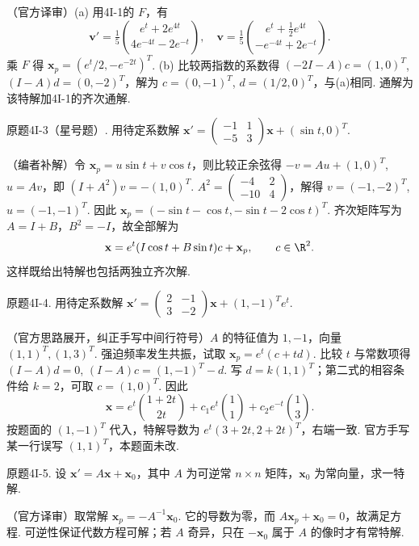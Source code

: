 \begin{solution}（官方译审）(a) 用4I-1的 $F$，有
\[\mathbf v'=\tfrac15\binom{e^t+2e^{4t}}{4e^{-4t}-2e^{-t}},\quad
\mathbf v=\tfrac15\binom{e^t+\frac12e^{4t}}{-e^{-4t}+2e^{-t}}.\]
乘 $F$ 得 $\mathbf x_p=(e^t/2,-e^{-2t})^T$. (b) 比较两指数的系数得 $(-2I-A)c=(1,0)^T$, $(I-A)d=(0,-2)^T$，解为 $c=(0,-1)^T$, $d=(1/2,0)^T$，与(a)相同. 通解为该特解加4I-1的齐次通解.\end{solution}
\begin{exercise}\label{cw:bank-4I-3}原题4I-3（星号题）. 用待定系数解 $\mathbf x'=\begin{pmatrix}-1&1\\-5&3\end{pmatrix}\mathbf x+(\sin t,0)^T$.\end{exercise}
\begin{solution}（编者补解）令 $\mathbf x_p=u\sin t+v\cos t$，则比较正余弦得 $-v=Au+(1,0)^T$, $u=Av$，即 $(I+A^2)v=-(1,0)^T$. $A^2=\begin{pmatrix}-4&2\\-10&4\end{pmatrix}$，解得 $v=(-1,-2)^T$, $u=(-1,-1)^T$. 因此 $\mathbf x_p=(-\sin t-\cos t,-\sin t-2\cos t)^T$. 齐次矩阵写为 $A=I+B$，$B^2=-I$，故全部解为
\[\mathbf x=e^t(I\cos t+B\sin t)c+\mathbf x_p,\qquad c\in\R^2.\]
这样既给出特解也包括两独立齐次解.\end{solution}
\begin{exercise}\label{cw:bank-4I-4}原题4I-4. 用待定系数解 $\mathbf x'=\begin{pmatrix}2&-1\\3&-2\end{pmatrix}\mathbf x+(1,-1)^Te^t$.\end{exercise}
\begin{solution}（官方思路展开，纠正手写中间行符号）$A$ 的特征值为 $1,-1$，向量 $(1,1)^T,(1,3)^T$. 强迫频率发生共振，试取 $\mathbf x_p=e^t(c+td)$. 比较 $t$ 与常数项得 $(I-A)d=0$, $(I-A)c=(1,-1)^T-d$. 写 $d=k(1,1)^T$；第二式的相容条件给 $k=2$，可取 $c=(1,0)^T$. 因此
\[\mathbf x=e^t\binom{1+2t}{2t}+c_1e^t\binom11+c_2e^{-t}\binom13.\]
按题面的 $(1,-1)^T$ 代入，特解导数为 $e^t(3+2t,2+2t)^T$，右端一致. 官方手写某一行误写 $(1,1)^T$，本题面未改.\end{solution}
\begin{exercise}\label{cw:bank-4I-5}原题4I-5. 设 $\mathbf x'=A\mathbf x+\mathbf x_0$，其中 $A$ 为可逆常 $n\times n$ 矩阵，$\mathbf x_0$ 为常向量，求一特解.\end{exercise}
\begin{solution}（官方译审）取常解 $\mathbf x_p=-A^{-1}\mathbf x_0$. 它的导数为零，而 $A\mathbf x_p+\mathbf x_0=0$，故满足方程. 可逆性保证代数方程可解；若 $A$ 奇异，只在 $-\mathbf x_0$ 属于 $A$ 的像时才有常特解.\end{solution}
